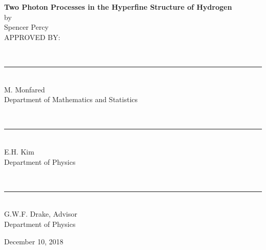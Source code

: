 \begin{approval}
\begin{center}
	\textbf{ \large Two Photon Processes in the Hyperfine Structure of Hydrogen} \\
	by \\
	Spencer Percy \\





APPROVED BY:







~\\ \rule{10 cm}{.5pt} \\
M. Monfared \\
Department of Mathematics and Statistics


~\\ \rule{10 cm}{.5pt} \\
E.H. Kim \\
Department of Physics




~\\ \rule{10 cm}{.5pt} \\
G.W.F. Drake, Advisor \\
Department of Physics







\end{center}
\begin{flushright}
	December 10, 2018
\end{flushright}



\end{approval}
